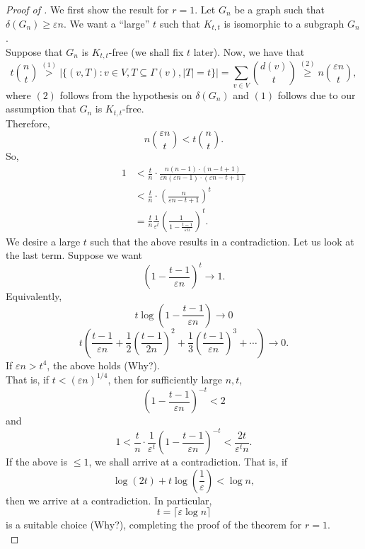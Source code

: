 			\begin{proof}[Proof of ]
				We first show the result for $r=1$. Let $G_n$ be a graph such that $\delta(G_n) \ge \varepsilon n$. We want a ``large'' $t$ such that $K_{t,t}$ is isomorphic to a subgraph $G_n$.\\
				Suppose that $G_n$ is $K_{t,t}$-free (we shall fix $t$ later).
				Now, we have that
				\[ t \binom{n}{t} \stackrel{(1)}{>} |\{(v,T) : v\in V, T \subseteq \Gamma(v), |T|=t\}| = \sum_{v\in V} \binom{d(v)}{t} \stackrel{(2)}{\ge} n \binom{\varepsilon n}{t}, \]
				where $(2)$ follows from the hypothesis on $\delta(G_n)$ and $(1)$ follows due to our assumption that $G_n$ is $K_{t,t}$-free.\\
				Therefore,
				\[ n\binom{\varepsilon n}{t} < t \binom{n}{t}. \]
				So,
				\begin{align*}
					1 &< \frac{t}{n} \cdot \frac{n(n-1)\cdot (n-t+1)}{\varepsilon n(\varepsilon n-1)\cdot (\varepsilon n-t+1)} \\
					&< \frac{t}{n} \cdot \left(\frac{n}{\varepsilon n-t+1}\right)^t \\
					&= \frac{t}{n} \frac{1}{\varepsilon^t} \left(\frac{1}{1 - \frac{t-1}{\varepsilon n}}\right)^t.
				\end{align*}
				We desire a large $t$ such that the above results in a contradiction.
				Let us look at the last term. Suppose we want
				\[ \left(1 - \frac{t-1}{\varepsilon n}\right)^t \to 1. \]
				Equivalently,
				\[ t \log\left(1 - \frac{t-1}{\varepsilon n}\right) \to 0 \]
				\[ t \left(\frac{t-1}{\varepsilon n} + \frac{1}{2}\left(\frac{t-1}{2n}\right)^2 + \frac{1}{3} \left(\frac{t-1}{\varepsilon n}\right)^3 + \cdots\right) \to 0. \]
				If $\varepsilon n > t^4$, the above holds (Why?).\\
				That is, if $t < (\varepsilon n)^{1/4}$, then for sufficiently large $n, t$,
				\[ \left(1 - \frac{t-1}{\varepsilon n}\right)^{-t} < 2 \]
				and
				\[ 1 < \frac{t}{n} \cdot \frac{1}{\varepsilon^t} \left(1 - \frac{t-1}{\varepsilon n}\right)^{-t} < \frac{2t}{\varepsilon^t n}. \]
				If the above is $\le 1$, we shall arrive at a contradiction. That is, if
				\[ \log(2t) + t \log\left(\frac{1}{\varepsilon}\right) < \log n, \]
				then we arrive at a contradiction. In particular,
				\[ t = \lceil \varepsilon \log n \rceil \]
				is a suitable choice (Why?), completing the proof of the theorem for $r=1$.\\


\end{proof}
